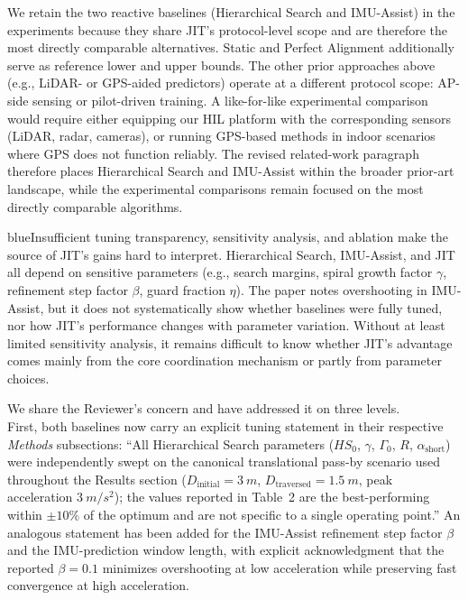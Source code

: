 \documentclass{article}
\newcommand{\blue}[1]{\begin{color}{blue}#1\end{color}}
\begin{document}
\noindent We retain the two reactive baselines (Hierarchical Search and IMU-Assist) in the experiments because they share JIT's protocol-level scope and are therefore the most directly comparable alternatives. Static and Perfect Alignment additionally serve as reference lower and upper bounds. The other prior approaches above (e.g., LiDAR- or GPS-aided predictors) operate at a different protocol scope: AP-side sensing or pilot-driven training. A like-for-like experimental comparison would require either equipping our HIL platform with the corresponding sensors (LiDAR, radar, cameras), or running GPS-based methods in indoor scenarios where GPS does not function reliably. The revised related-work paragraph therefore places Hierarchical Search and IMU-Assist within the broader prior-art landscape, while the experimental comparisons remain focused on the most directly comparable algorithms.

\begin{tcbremark}
{\selectfont
\blue{Insufficient tuning transparency, sensitivity analysis, and ablation make the source of JIT's gains hard to interpret. Hierarchical Search, IMU-Assist, and JIT all depend on sensitive parameters (e.g., search margins, spiral growth factor $\gamma$, refinement step factor $\beta$, guard fraction $\eta$). The paper notes overshooting in IMU-Assist, but it does not systematically show whether baselines were fully tuned, nor how JIT's performance changes with parameter variation. Without at least limited sensitivity analysis, it remains difficult to know whether JIT's advantage comes mainly from the core coordination mechanism or partly from parameter choices.}
}
\end{tcbremark}

\noindent We share the Reviewer's concern and have addressed it on three levels.\\

\noindent First, both baselines now carry an explicit tuning statement in their respective \emph{Methods} subsections: ``All Hierarchical Search parameters ($HS_0$, $\gamma$, $\Gamma_0$, $R$, $\alpha_{\text{short}}$) were independently swept on the canonical translational pass-by scenario used throughout the Results section ($D_{\text{initial}} = \SI{3}{m}$, $D_{\text{traversed}} = \SI{1.5}{m}$, peak acceleration $\SI{3}{m/s^2}$); the values reported in Table~2 are the best-performing within $\pm10\%$ of the optimum and are not specific to a single operating point.'' An analogous statement has been added for the IMU-Assist refinement step factor $\beta$ and the IMU-prediction window length, with explicit acknowledgment that the reported $\beta = 0.1$ minimizes overshooting at low acceleration while preserving fast convergence at high acceleration.\\
\end{document}

